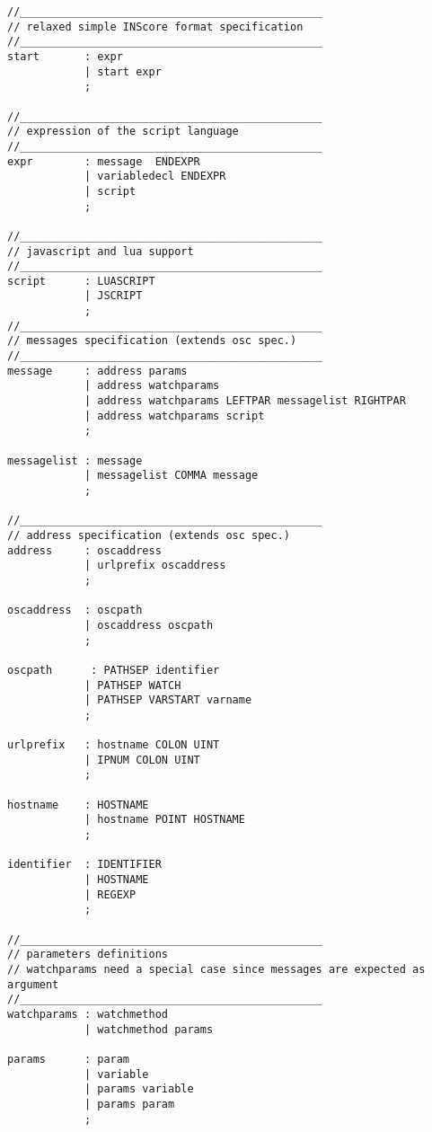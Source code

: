 \begin{verbatim}
//_______________________________________________
// relaxed simple INScore format specification
//_______________________________________________
start       : expr
            | start expr
            ;

//_______________________________________________
// expression of the script language
//_______________________________________________
expr        : message  ENDEXPR		
            | variabledecl ENDEXPR	
            | script            
            ;

//_______________________________________________
// javascript and lua support
//_______________________________________________
script      : LUASCRIPT            
            | JSCRIPT            
            ;
//_______________________________________________
// messages specification (extends osc spec.)
//_______________________________________________
message	    : address params            
            | address watchparams		
            | address watchparams LEFTPAR messagelist RIGHTPAR
            | address watchparams script 
            ;

messagelist : message            		
            | messagelist COMMA message 
            ;

//_______________________________________________
// address specification (extends osc spec.)
address	    : oscaddress            	
            | urlprefix oscaddress		
            ;

oscaddress  : oscpath            		
            | oscaddress oscpath		
            ;

oscpath	     : PATHSEP identifier		
            | PATHSEP WATCH            	
            | PATHSEP VARSTART varname	
            ;

urlprefix   : hostname COLON UINT		
            | IPNUM COLON UINT            
            ;

hostname    : HOSTNAME            		
            | hostname POINT HOSTNAME	
            ;

identifier  : IDENTIFIER		
            | HOSTNAME            
            | REGEXP            
            ;

//_______________________________________________
// parameters definitions
// watchparams need a special case since messages are expected as argument
//_______________________________________________
watchparams : watchmethod		
            | watchmethod params 

params      : param            	
            | variable            
            | params variable	
            | params param		
            ;


\end{verbatim}
